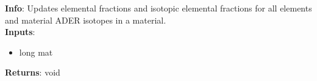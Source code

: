 \textbf{Info}: Updates elemental fractions and isotopic elemental fractions
for all elements and material ADER isotopes in a material. \\

\noindent \textbf{Inputs}:
\begin{itemize}
\item{long mat}
\end{itemize}

\noindent \textbf{Returns}: void
